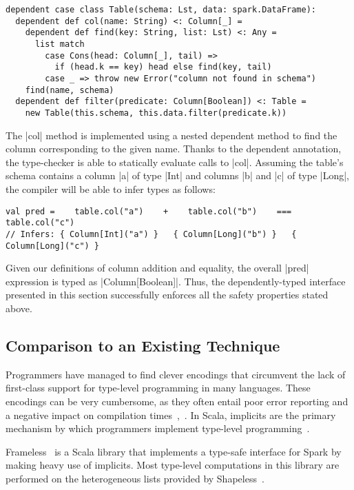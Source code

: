 \begin{lstlisting}
dependent case class Table(schema: Lst, data: spark.DataFrame):
  dependent def col(name: String) <: Column[_] =
    dependent def find(key: String, list: Lst) <: Any =
      list match
        case Cons(head: Column[_], tail) =>
          if (head.k == key) head else find(key, tail)
        case _ => throw new Error("column not found in schema")
    find(name, schema)
  dependent def filter(predicate: Column[Boolean]) <: Table =
    new Table(this.schema, this.data.filter(predicate.k))
\end{lstlisting}

The |col| method is implemented using a nested dependent method to find the column corresponding to the given name.
Thanks to the dependent annotation, the type-checker is able to statically evaluate calls to |col|.
Assuming the table's schema contains a column |a| of type |Int| and columns |b| and |c| of type |Long|, the compiler will be able to infer types as follows:

\begin{lstlisting}
val pred =    table.col("a")    +    table.col("b")    ===   table.col("c")
// Infers: { Column[Int]("a") }   { Column[Long]("b") }   { Column[Long]("c") }
\end{lstlisting}

\noindent
Given our definitions of column addition and equality, the overall |pred| expression is typed as |Column[Boolean]|.
Thus, the dependently-typed interface presented in this section successfully enforces all the safety properties stated above.

\subsection{Comparison to an Existing Technique}


Programmers have managed to find clever encodings that circumvent the lack of first-class support for type-level programming in many languages.
These encodings can be very cumbersome, as they often entail poor error reporting and a negative impact on compilation times~\citep{mcbride2002faking},~\citep{kiselyov2004strongly}.
In Scala, implicits are the primary mechanism by which programmers implement type-level programming~\citep{odersky2018simplicitly}.

Frameless~\citep{blanvillain2016frameless} is a Scala library that implements a type-safe interface for Spark by making heavy use of implicits.
Most type-level computations in this library are performed on the heterogeneous lists provided by Shapeless~\citep{sabin2011shapeless}.

